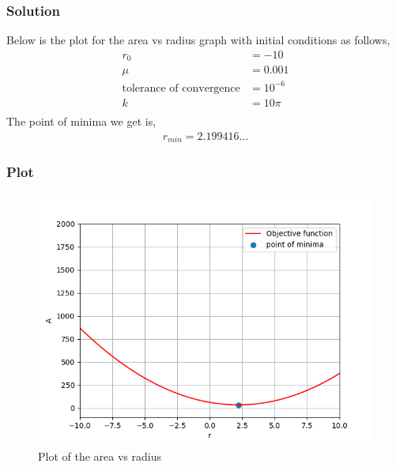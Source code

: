 \documentclass{beamer}
\theoremstyle{remark}
\numberwithin{equation}{section}
\begin{document}
		\begin{frame}
      \frametitle{Solution}
			Below is the plot for the area vs radius graph with initial conditions as follows,
\begin{align}
	r_0 &= -10\\
	\mu &= 0.001\\
	\text{tolerance of convergence} &= 10^{-6}\\
	k &= 10\pi\\
\end{align}
The point of minima we get is,
\begin{align}
	r_{min} = 2.199416...
\end{align}
\end{frame}
\begin{frame}
      \frametitle{Plot}
	\begin{figure}[h!]
	\centering
	\includegraphics[width=1\columnwidth]{figs/simulated.png}
	\caption{Plot of the area vs radius}
	\label{stemplot}
\end{figure}
\end{frame}
\end{document}
